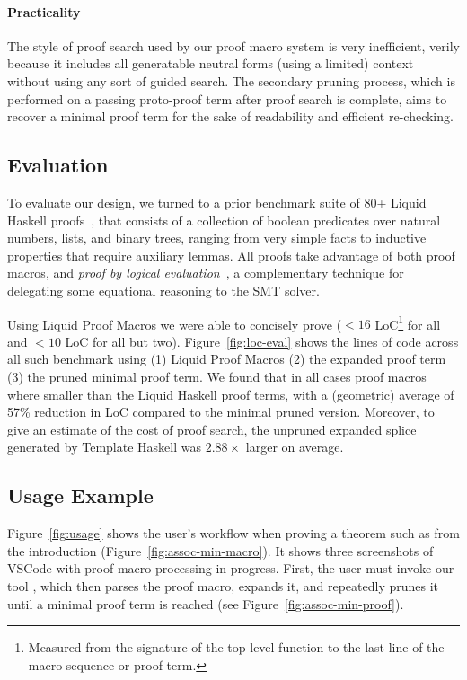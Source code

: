 \paragraph{Practicality}
%
The style of proof search used by our proof macro system is very
inefficient, verily because it includes all generatable neutral forms
(using a limited) context without using any sort of guided search. The
secondary pruning process, which is performed on a passing proto-proof
term after proof search is complete, aims to recover a minimal proof
term for the sake of readability and efficient re-checking.

\subsection{Evaluation}
\label{sec:eval-eval}

To evaluate our design, we turned to a prior benchmark suite of 80+
Liquid Haskell proofs~\cite{TacticThesis}, that consists of a
collection of boolean predicates over natural numbers, lists, and
binary trees, ranging from very simple facts to inductive properties
that require auxiliary lemmas. All proofs take advantage of both proof
macros, and {\em proof by logical evaluation}~\cite{VazouTCSNWJ18}, a
complementary technique for delegating some equational reasoning to
the SMT solver.

Using Liquid Proof Macros we were able to concisely prove ($<16$
LoC\footnote{Measured from the signature of the top-level function to the last
line of the macro sequence or proof term.} for all and $<10$ LoC for all but
two). Figure~\ref{fig:loc-eval} shows the lines of code across all such
benchmark using (1) Liquid Proof Macros (2) the expanded proof term (3) the
pruned minimal proof term. We found that in all cases proof macros where smaller
than the Liquid Haskell proof terms, with a (geometric) average of 57\%
reduction in LoC compared to the minimal pruned version. Moreover, to give an
estimate of the cost of proof search, the unpruned expanded splice generated by
Template Haskell was $2.88\times$ larger on average.

\subsection{Usage Example}
\label{sec:example}

Figure~\ref{fig:usage} shows the user's workflow when proving a
theorem such as  from the introduction
(Figure~\ref{fig:assoc-min-macro}). It shows three screenshots of
VSCode with proof macro processing in progress. First, the user must
invoke our tool , which then parses the proof macro,
expands it, and repeatedly prunes it until a minimal proof term is
reached (see Figure~\ref{fig:assoc-min-proof}).

